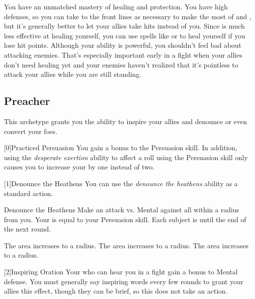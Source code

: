              You have an unmatched mastery of healing and protection.
            You have high defenses, so you can take to the front lines as necessary to make the most of  and , but it's generally better to let your allies take hits instead of you.
            Since  is much less effective at healing yourself, you can use spells like  or  to heal yourself if you lose hit points.
            Although your  ability is powerful, you shouldn't feel bad about attacking enemies.
            That's especially important early in a fight when your allies don't need healing yet and your enemies haven't realized that it's pointless to attack your allies while you are still standing.

    \newpage
    \subsection{Preacher}
        This archetype grants you the ability to inspire your allies and denounce or even convert your foes.

        [0]{Practiced Persuasion} You gain a  bonus to the Persuasion skill.
        In addition, using the \textit{desperate exertion} ability to affect a roll using the Persuasion skill only causes you to increase your  by one instead of two.

        [1]{Denounce the Heathens} You can use the \textit{denounce the heathens} ability as a standard action.
        \begin{instantability}{Denounce the Heathens}
            Make an attack vs. Mental against all  within a \medarea radius from you.
            Your  is equal to your Persuasion skill.
            \hit Each subject is \dazed until the end of the next round.

            \rankline
             The area increases to a \largearea radius.
             The area increases to a \hugearea radius.
             The area increases to a \gargarea radius.
        \end{instantability}

        [2]{Inspiring Oration} Your  who can hear you in a fight gain a  bonus to Mental defense.
        You must generally say inspiring words every few rounds to grant your allies this effect, though they can be brief, so this does not take an action.

